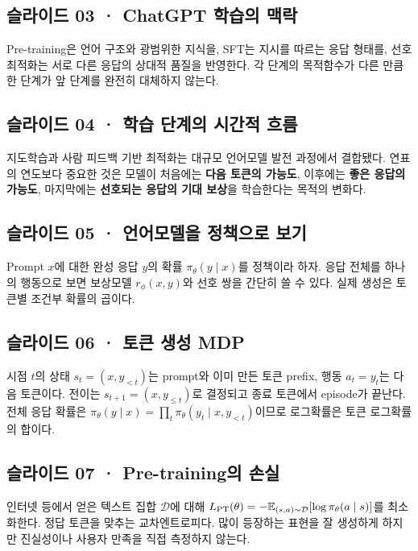 \documentclass[11pt,a4paper]{article}
\begin{document}
\subsection{슬라이드 03 · ChatGPT 학습의 맥락}

Pre-training은 언어 구조와 광범위한 지식을, SFT는 지시를 따르는 응답 형태를, 선호 최적화는 서로 다른 응답의 상대적 품질을 반영한다. 각 단계의 목적함수가 다른 만큼 한 단계가 앞 단계를 완전히 대체하지 않는다.\par

\subsection{슬라이드 04 · 학습 단계의 시간적 흐름}

지도학습과 사람 피드백 기반 최적화는 대규모 언어모델 발전 과정에서 결합됐다. 연표의 연도보다 중요한 것은 모델이 처음에는 \textbf{다음 토큰의 가능도}, 이후에는 \textbf{좋은 응답의 가능도}, 마지막에는 \textbf{선호되는 응답의 기대 보상}을 학습한다는 목적의 변화다.\par

\subsection{슬라이드 05 · 언어모델을 정책으로 보기}

Prompt $x$에 대한 완성 응답 $y$의 확률 $\pi_\theta(y\mid x)$를 정책이라 하자. 응답 전체를 하나의 행동으로 보면 보상모델 $r_\phi(x,y)$와 선호 쌍을 간단히 쓸 수 있다. 실제 생성은 토큰별 조건부 확률의 곱이다.\par

\subsection{슬라이드 06 · 토큰 생성 MDP}

시점 $t$의 상태 $s_t=(x,y_{<t})$는 prompt와 이미 만든 토큰 prefix, 행동 $a_t=y_t$는 다음 토큰이다. 전이는 $s_{t+1}=(x,y_{\le t})$로 결정되고 종료 토큰에서 episode가 끝난다. 전체 응답 확률은 $\pi_\theta(y\mid x)=\prod_t\pi_\theta(y_t\mid x,y_{<t})$이므로 로그확률은 토큰 로그확률의 합이다.\par

\subsection{슬라이드 07 · Pre-training의 손실}

인터넷 등에서 얻은 텍스트 집합 $\mathcal D$에 대해 $L_{\rm PT}(\theta)=-\mathbb E_{(s,a)\sim\mathcal D}[\log\pi_\theta(a\mid s)]$를 최소화한다. 정답 토큰을 맞추는 교차엔트로피다. 많이 등장하는 표현을 잘 생성하게 하지만 진실성이나 사용자 만족을 직접 측정하지 않는다.\par
\end{document}
